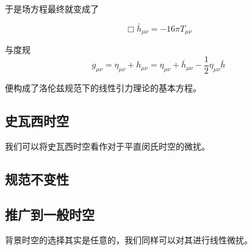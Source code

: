 于是场方程最终就变成了

\begin{equation}
\Box\bar{h}_{\mu\nu} = -16\pi T_{\mu\nu}
\end{equation}

与度规
\begin{equation}
g_{\mu\nu}= \eta_{\mu\nu} + h_{\mu\nu}=\eta_{\mu\nu} + \bar{h}_{\mu\nu} - \frac{1}{2}\eta_{\mu\nu} \bar{h}
\end{equation}

便构成了洛伦兹规范下的线性引力理论的基本方程。


\subsection{史瓦西时空}

我们可以将史瓦西时空看作对于平直闵氏时空的微扰。


\subsection{规范不变性}


\subsection{推广到一般时空}

背景时空的选择其实是任意的，我们同样可以对其进行线性微扰。

